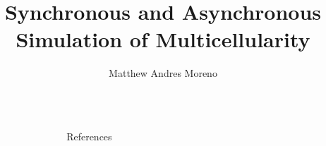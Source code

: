 \documentclass[final,table]{beamer}
\title{Synchronous and Asynchronous Simulation of Multicellularity} %
\author{Matthew Andres Moreno} %
\institute{Michigan State University}%
\newlength{\sepwid}
\newlength{\onecolwid}
\newlength{\twocolwid}
\begin{document}

\setlength{\belowcaptionskip}{0ex} %
\setlength\belowdisplayshortskip{2ex} %

\begin{frame}[t] %
\vspace{-1ex}
\begin{columns}[t] %

\begin{column}{\sepwid}\end{column} %

\begin{column}{\onecolwid} %



\begin{block}{References}
{\tiny
}
\end{block}








\end{column} %

\begin{column}{\sepwid}\end{column} %

\begin{column}{\twocolwid} %


\end{column}
\end{columns}
\end{frame}
\end{document}
